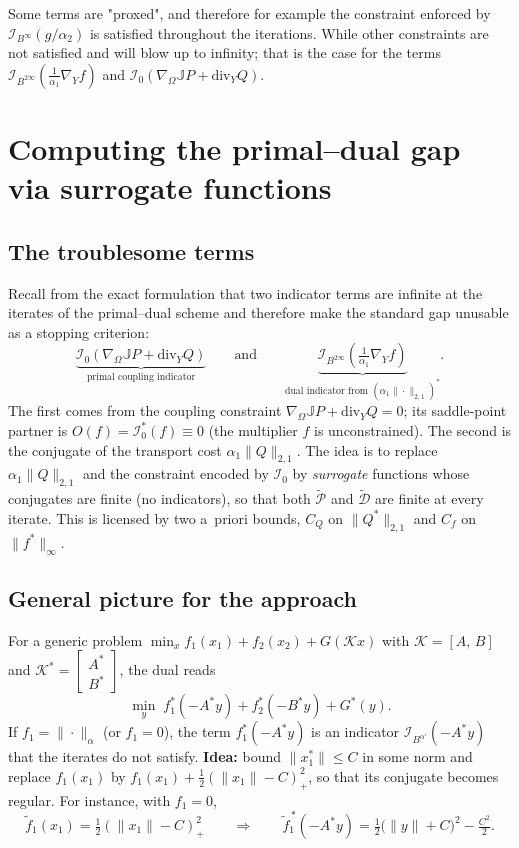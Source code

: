 \documentclass{article}
\newcommand{\pospart}[1]{\left(#1\right)_{+}}
\begin{document}
Some terms are "proxed", and therefore for example the constraint enforced by $\mathcal{I}_{B^\infty}(g/\alpha_2)$ is satisfied throughout the iterations. While other constraints are not satisfied and will blow up to infinity; that is the case for the terms
$ \mathcal{I}_{B^{2\infty}}(\tfrac{1}{\alpha_1}\nabla_Y f) $ and $ \mathcal{I}_0(\nabla_\Omega\mathbb{J}P + \mathrm{div}_Y Q) $.


\section*{Computing the primal--dual gap via surrogate functions}

\subsection*{The troublesome terms}

Recall from the exact formulation that two indicator terms are infinite at the
iterates of the primal--dual scheme and therefore make the standard gap
unusable as a stopping criterion:
$$
\underbrace{\mathcal{I}_0(\nabla_\Omega\mathbb{J}P + \mathrm{div}_Y Q)}_{\text{primal coupling indicator}}
\qquad\text{and}\qquad
\underbrace{\mathcal{I}_{B^{2\infty}}\!\left(\tfrac{1}{\alpha_1}\nabla_Y f\right)}_{\text{dual indicator from }(\alpha_1\|\cdot\|_{2,1})^{*}} .
$$
The first comes from the coupling constraint $\nabla_\Omega\mathbb{J}P + \mathrm{div}_Y Q = 0$;
its saddle-point partner is $O(f)=\mathcal{I}_0^{*}(f)\equiv 0$ (the multiplier $f$ is unconstrained).
The second is the conjugate of the transport cost $\alpha_1\|Q\|_{2,1}$.
The idea is to replace $\alpha_1\|Q\|_{2,1}$ and the constraint encoded by $\mathcal{I}_0$ by
\emph{surrogate} functions whose conjugates are finite (no indicators), so that both
$\widetilde{\mathcal{P}}$ and $\widetilde{\mathcal{D}}$ are finite at every iterate.
This is licensed by two a~priori bounds, $C_Q$ on $\|Q^{*}\|_{2,1}$ and $C_f$ on $\|f^{*}\|_\infty$.

\subsection*{General picture for the approach}

For a generic problem $\min_x f_1(x_1)+f_2(x_2)+G(\mathcal{K}x)$ with
$\mathcal{K}=[A,\,B]$ and $\mathcal{K}^{*}=\begin{bmatrix}A^{*}\\ B^{*}\end{bmatrix}$,
the dual reads
$$
\min_y\; f_1^{*}(-A^{*}y)+f_2^{*}(-B^{*}y)+G^{*}(y).
$$
If $f_1=\|\cdot\|_\alpha$ (or $f_1=0$), the term $f_1^{*}(-A^{*}y)$ is an indicator
$\mathcal{I}_{B^{\alpha'}}(-A^{*}y)$ that the iterates do not satisfy.
\textbf{Idea:} bound $\|x_1^{*}\|\le C$ in some norm and replace $f_1(x_1)$ by
$f_1(x_1)+\tfrac{1}{2}\pospart{\|x_1\|-C}^{2}$, so that its conjugate becomes regular.
For instance, with $f_1=0$,
$$
\widetilde{f}_1(x_1)=\tfrac{1}{2}\pospart{\|x_1\|-C}^{2}
\qquad\Longrightarrow\qquad
\widetilde{f}_1^{\,*}(-A^{*}y)=\tfrac{1}{2}\big(\|y\|+C\big)^{2}-\tfrac{C^{2}}{2}.
$$
\end{document}
